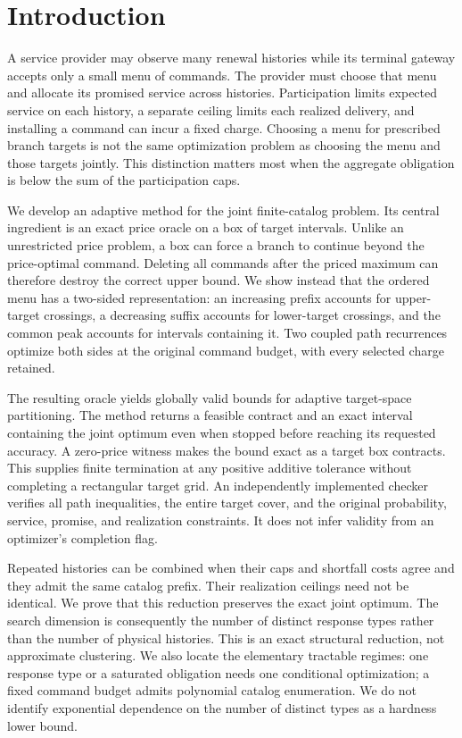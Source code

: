 \section{Introduction}
A service provider may observe many renewal histories while its terminal gateway accepts only a small menu of commands. The provider must choose that menu and allocate its promised service across histories. Participation limits expected service on each history, a separate ceiling limits each realized delivery, and installing a command can incur a fixed charge. Choosing a menu for prescribed branch targets is not the same optimization problem as choosing the menu and those targets jointly. This distinction matters most when the aggregate obligation is below the sum of the participation caps.

We develop an adaptive method for the joint finite-catalog problem. Its central ingredient is an exact price oracle on a box of target intervals. Unlike an unrestricted price problem, a box can force a branch to continue beyond the price-optimal command. Deleting all commands after the priced maximum can therefore destroy the correct upper bound. We show instead that the ordered menu has a two-sided representation: an increasing prefix accounts for upper-target crossings, a decreasing suffix accounts for lower-target crossings, and the common peak accounts for intervals containing it. Two coupled path recurrences optimize both sides at the original command budget, with every selected charge retained.

The resulting oracle yields globally valid bounds for adaptive target-space partitioning. The method returns a feasible contract and an exact interval containing the joint optimum even when stopped before reaching its requested accuracy. A zero-price witness makes the bound exact as a target box contracts. This supplies finite termination at any positive additive tolerance without completing a rectangular target grid. An independently implemented checker verifies all path inequalities, the entire target cover, and the original probability, service, promise, and realization constraints. It does not infer validity from an optimizer's completion flag.

Repeated histories can be combined when their caps and shortfall costs agree and they admit the same catalog prefix. Their realization ceilings need not be identical. We prove that this reduction preserves the exact joint optimum. The search dimension is consequently the number of distinct response types rather than the number of physical histories. This is an exact structural reduction, not approximate clustering. We also locate the elementary tractable regimes: one response type or a saturated obligation needs one conditional optimization; a fixed command budget admits polynomial catalog enumeration. We do not identify exponential dependence on the number of distinct types as a hardness lower bound.

